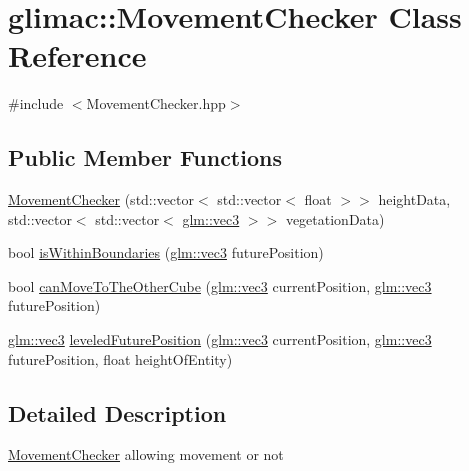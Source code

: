 \hypertarget{classglimac_1_1_movement_checker}{}\section{glimac\+:\+:Movement\+Checker Class Reference}
\label{classglimac_1_1_movement_checker}


{\ttfamily \#include $<$Movement\+Checker.\+hpp$>$}

\subsection*{Public Member Functions}
\begin{DoxyCompactItemize}
\item 
\hyperlink{classglimac_1_1_movement_checker_aa1caa8e0675e3c877e2c4f398e150016}{Movement\+Checker} (std\+::vector$<$ std\+::vector$<$ float $>$$>$ height\+Data, std\+::vector$<$ std\+::vector$<$ \hyperlink{group__core__types_ga1c47e8b3386109bc992b6c48e91b0be7}{glm\+::vec3} $>$$>$ vegetation\+Data)
\item 
bool \hyperlink{classglimac_1_1_movement_checker_a6071f115812fb9ee54e71b6fb64ace2b}{is\+Within\+Boundaries} (\hyperlink{group__core__types_ga1c47e8b3386109bc992b6c48e91b0be7}{glm\+::vec3} future\+Position)
\item 
bool \hyperlink{classglimac_1_1_movement_checker_a0ec58cde714926cf1f7b7e9d8c9ca1df}{can\+Move\+To\+The\+Other\+Cube} (\hyperlink{group__core__types_ga1c47e8b3386109bc992b6c48e91b0be7}{glm\+::vec3} current\+Position, \hyperlink{group__core__types_ga1c47e8b3386109bc992b6c48e91b0be7}{glm\+::vec3} future\+Position)
\item 
\hyperlink{group__core__types_ga1c47e8b3386109bc992b6c48e91b0be7}{glm\+::vec3} \hyperlink{classglimac_1_1_movement_checker_a42d9202e15606562e493f70ca3305e1b}{leveled\+Future\+Position} (\hyperlink{group__core__types_ga1c47e8b3386109bc992b6c48e91b0be7}{glm\+::vec3} current\+Position, \hyperlink{group__core__types_ga1c47e8b3386109bc992b6c48e91b0be7}{glm\+::vec3} future\+Position, float height\+Of\+Entity)
\end{DoxyCompactItemize}


\subsection{Detailed Description}
\hyperlink{classglimac_1_1_movement_checker}{Movement\+Checker} allowing movement or not 

